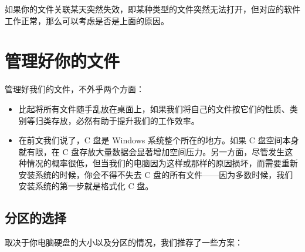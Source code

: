 {{{{如果你的文件关联某天突然失效，即某种类型的文件突然无法打开，但对应的软件工作正常，那么可以考虑是否是上面的原因。

\section{管理好你的文件}

管理好我们的文件，不外乎两个方面：

\begin{itemize}
  \item {}比起将所有文件随手乱放在桌面上，如果我们将自己的文件按它们的性质、类别等归类存放，必然有助于提升我们的工作效率。
  \item {}在前文我们说了，C 盘是 Windows 系统整个所在的地方。如果 C 盘空间本身就有限，在 C 盘存放大量数据会显著增加空间压力。另一方面，尽管发生这种情况的概率很低，但当我们的电脑因为这样或那样的原因损坏，而需要重新安装系统的时候，你会不得不失去 C 盘的所有文件——因为多数时候，我们安装系统的第一步就是格式化 C 盘。
\end{itemize}

\subsection{分区的选择}

取决于你电脑硬盘的大小以及分区的情况，我们推荐了一些方案：

}}}}
